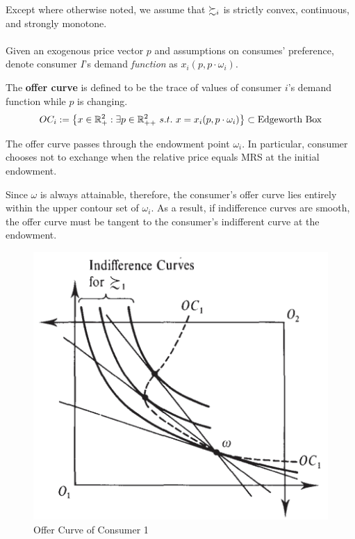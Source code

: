 \documentclass{report}
\begin{document}
		\begin{assumption}
			Except where otherwise noted, we assume that $\succsim_i$ is strictly convex, continuous, and strongly monotone.
		\end{assumption}
		
		\paragraph{} Given an exogenous price vector $p$ and assumptions on consumes' preference, denote consumer $I$'s demand \emph{function} as $x_i(p, p\cdot \omega_i)$.
		
		\begin{definition}
			The \textbf{offer curve} is defined to be the trace of values of consumer $i$'s demand function while $p$ is changing.
			\begin{equation}
				OC_i := \left \{
				x \in \mathbb{R}^2_+:
				\exists p \in \mathbb{R}^2_{++}\ s.t.\ x = x_i(p, p\cdot \omega_i)
				\right \} \subset \text{{Edgeworth Box}}
			\end{equation}
		\end{definition}
		
		\begin{remark}
			The offer curve passes through the endowment point $\omega_i$. In particular, consumer chooses not to exchange when the relative price equals MRS at the initial endowment.
		\end{remark}
		
		\begin{remark}
			Since $\omega$ is always attainable, therefore, the consumer's offer curve lies entirely within the upper contour set of $\omega_i$. As a result, if indifference curves are smooth, the offer curve must be tangent to the consumer's indifferent curve at the endowment.
		\end{remark}
		
		\begin{figure}[h]
			\centering
			\includegraphics[width=0.35\linewidth]{figures/OC.png}
			\caption{Offer Curve of Consumer 1}
		\end{figure}
		
\end{document}

